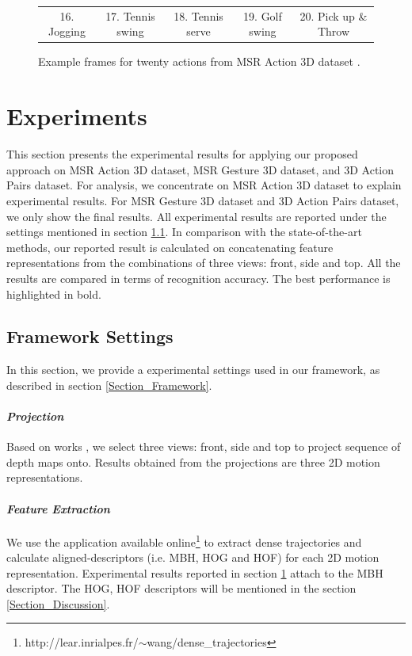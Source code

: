 \documentclass[final,3p,times,twocolumn]{elsarticle}
\begin{document}
\begin{figure}[ht]
{\begin{tabular}{ccccc}
			16. Jogging &         17. Tennis swing &          18. Tennis serve &          19. Golf swing &          20. Pick up \& Throw \\
			
		\end{tabular}  
		
	}
	\caption{Example frames for twenty actions from MSR Action 3D dataset \cite{li2010action}.}
	\label{Figure_ExampleFrames_MSRAction3D}
\end{figure}

\section{Experiments}
\label{Section_Experiments}
This section presents the experimental results for applying our proposed approach on MSR Action 3D dataset, MSR Gesture 3D dataset, and 3D Action Pairs dataset.
For analysis, we concentrate on MSR Action 3D dataset to explain experimental results.
For MSR Gesture 3D dataset and 3D Action Pairs dataset, we only show the final results.
All experimental results are reported under the settings mentioned in section \ref{Subsection_ExperimentalSettings}.
In comparison with the state-of-the-art methods, our reported result is calculated on concatenating feature representations from the combinations of three views: front, side and top.
All the results are compared in terms of recognition accuracy.
The best performance is highlighted in bold.

\subsection{Framework Settings}
\label{Subsection_ExperimentalSettings}

In this section, we provide a experimental settings used in our framework, as described in section \ref{Section_Framework}.

\paragraph{\bf \textit{Projection}}
Based on works \cite{li2010action, yang2012recognizing}, we select three views: front, side and top to project sequence of depth maps onto.
Results obtained from the projections are three 2D motion representations.

\paragraph{\bf \textit{Feature Extraction}}
We use the application available online\footnote{http://lear.inrialpes.fr/$\sim$wang/dense\_trajectories} to extract dense trajectories and calculate aligned-descriptors (i.e. MBH, HOG and HOF) for each 2D motion representation.
Experimental results reported in section \ref{Section_Experiments} attach to the MBH descriptor.
The HOG, HOF descriptors will be mentioned in the section \ref{Section_Discussion}.
\end{document}
